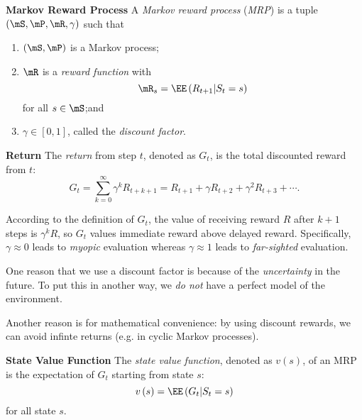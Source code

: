 \documentclass[RL]{subfiles}
\begin{document}
    \begin{definition}{\textbf{Markov Reward Process}}
        A \emph{Markov reward process} (\emph{MRP}) is a tuple $\left( \mS,\mP,\mR,\gamma \right)$ such that 
        \begin{enumerate}
            \item $\left( \mS,\mP \right)$ is a Markov process;
            \item $\mR$ is a \emph{reward function} with
                \begin{equation*}
                    \mR_s = \EE\left( R_{t+1}|S_t=s \right)
                \end{equation*}
                for all $s\in\mS$;\footnotemark[1] and
            \item $\gamma\in\left[ 0,1 \right]$, called the \emph{discount factor}.
        \end{enumerate}
        
        \noindent
        \begin{minipage}{\textwidth}
        \end{minipage}
    \end{definition}

    \begin{definition}{\textbf{Return}}
        The \emph{return} from step $t$, denoted as $G_t$, is the total discounted reward from $t$:
        \begin{equation*}
            G_t = \sum^{\infty}_{k=0}\gamma^k R_{t+k+1} = R_{t+1} + \gamma R_{t+2} + \gamma^{2}R_{t+3} + \cdots.
        \end{equation*}
    \end{definition}

    \np According to the definition of $G_t$, the value of receiving reward $R$ after $k+1$ steps is $\gamma^kR$, so $G_t$ values immediate reward above delayed reward. Specifically, $\gamma\approx 0$ leads to \emph{myopic} evaluation whereas $\gamma\approx 1$ leads to \emph{far-sighted} evaluation.

    \np One reason that we use a discount factor is because of the \textit{uncertainty} in the future. To put this in another way, we \textit{do not} have a perfect model of the environment. 

    Another reason is for mathematical convenience: by using discount rewards, we can avoid infinte returns (e.g. in cyclic Markov processes).

    \begin{definition}{\textbf{State Value Function}}
        The \emph{state value function}, denoted as $v\left( s \right)$, of an MRP is the expectation of $G_t$ starting from state $s$:
        \begin{equation*}
            v\left( s \right) = \EE\left( G_t|S_t=s \right)
        \end{equation*}
        for all state $s$.
    \end{definition}
\end{document}
